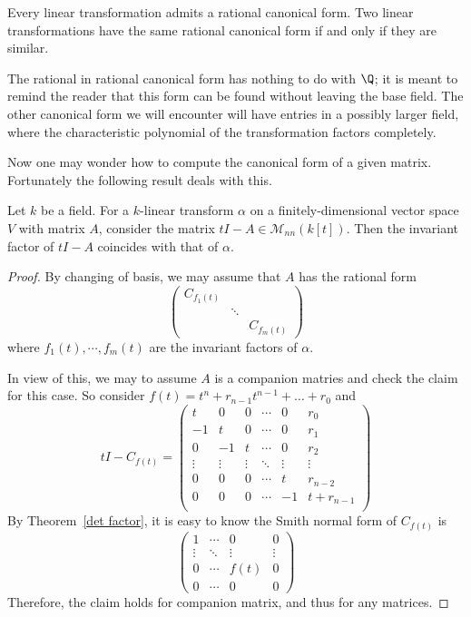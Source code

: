 \begin{corollary}
Every linear transformation admits a rational canonical form. Two linear transformations have the same rational canonical form if and only if they are similar.
\end{corollary}
\begin{remark}
The rational in rational canonical form has nothing to do with $\Q$; it is meant to remind the reader that this form can be found without leaving the base field. The other canonical form we will encounter will have entries in a possibly larger field, where the characteristic polynomial of the transformation factors completely.
\end{remark}
Now one may wonder how to compute the canonical form of a given matrix. Fortunately the following result deals with this.
\begin{proposition}\label{linear tI-A}
Let $k$ be a field. For a $k$-linear transform $\alpha$ on a finitely-dimensional vector space $V$ with matrix $A$, consider the matrix $tI-A\in\mathcal{M}_{nn}(k[t])$. Then the invariant factor of $tI-A$ coincides with that of $\alpha$.
\end{proposition}
\begin{proof}
By changing of basis, we may assume that $A$ has the rational form
\[\begin{pmatrix}
C_{f_1(t)}&&\\
&\ddots&\\
&&C_{f_m(t)}
\end{pmatrix}\]
where $f_1(t),\cdots,f_m(t)$ are the invariant factors of $\alpha$.\par
In view of this, we may to assume $A$ is a companion matries and check the claim for this case. So consider $f(t)=t^n+r_{n-1}t^{n-1}+\dots+r_0$ and 
\[tI-C_{f(t)}=\begin{pmatrix}
t&0&0&\cdots&0&r_0\\
-1&t&0&\cdots&0&r_1\\
0&-1&t&\cdots&0&r_2\\
\vdots&\vdots&\vdots&\ddots&\vdots&\vdots\\
0&0&0&\cdots&t&r_{n-2}\\
0&0&0&\cdots&-1&t+r_{n-1}\\
\end{pmatrix}\]
By Theorem~\ref{det factor}, it is easy to know the Smith normal form of $C_{f(t)}$ is
\[\left(\begin{array}{ccc|c}
1&\cdots&0&0\\
\vdots&\ddots&\vdots&\vdots\\
0&\cdots&f(t)&0\\
\hline
0&\cdots&0&0
\end{array}\right)\]
Therefore, the claim holds for companion matrix, and thus for any matrices.
\end{proof}
